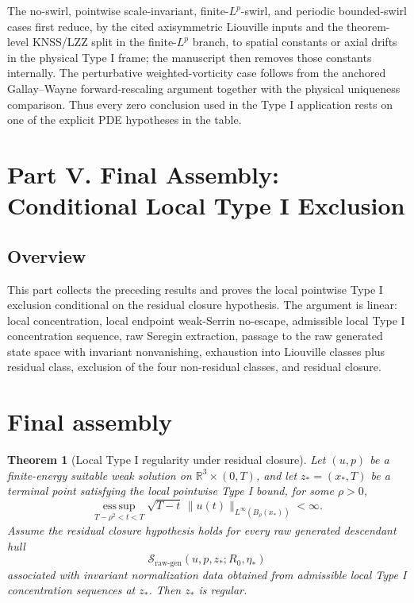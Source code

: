 \documentclass[11pt]{amsart}
\theoremstyle{plain}
\newtheorem{theorem}{Theorem}[section]
\theoremstyle{definition}
\theoremstyle{remark}
\numberwithin{equation}{section}
\newcommand{\R}{\mathbb R}
\newcommand{\esssup}{\operatorname*{ess\,sup}}
\newcommand{\calS}{\mathcal S}
\begin{document}
The no-swirl, pointwise scale-invariant, finite-\(L^p\)-swirl, and periodic
bounded-swirl cases first reduce, by the cited axisymmetric Liouville inputs
and the theorem-level KNSS/LZZ split in the finite-\(L^p\) branch, to spatial
constants or axial drifts in the physical Type I frame; the manuscript then
removes those constants internally.  The perturbative weighted-vorticity case
follows from the anchored Gallay--Wayne forward-rescaling argument together
with the physical uniqueness comparison.
Thus every zero conclusion used in the Type I application rests on one of the
explicit PDE hypotheses in the table.

\clearpage
\section*{Part V. Final Assembly: Conditional Local Type I Exclusion}
\label{p1:sec:final-assembly}

\subsection*{Overview}

This part collects the preceding results and proves the local pointwise Type I
exclusion conditional on the residual closure hypothesis.  The argument is
linear: local concentration, local endpoint weak-Serrin no-escape, admissible
local Type I concentration sequence, raw Seregin extraction, passage to the
raw generated state space with invariant nonvanishing, exhaustion into
Liouville classes plus residual class, exclusion of the four non-residual
classes, and residual closure.

\section{Final assembly}

\begin{theorem}[Local Type I regularity under residual closure]
\label{p1:thm:final-assembly}
Let \((u,p)\) be a finite-energy suitable weak solution on
\(\R^3\times(0,T)\), and let \(z_*=(x_*,T)\) be a terminal point satisfying
the local pointwise Type I bound, for some \(\rho>0\),
\[
  \esssup_{T-\rho^2<t<T}
  \sqrt{T-t}\,\|u(t)\|_{L^\infty(B_\rho(x_*))}<\infty .
\]
Assume the residual closure hypothesis  holds for
every raw generated descendant hull
\[
   \calS_{\mathrm{raw\text{-}gen}}(u,p,z_*;R_0,\eta_*)
\]
associated with invariant normalization data obtained from admissible local
Type I concentration sequences at \(z_*\).
Then \(z_*\) is regular.
\end{theorem}
\end{document}
